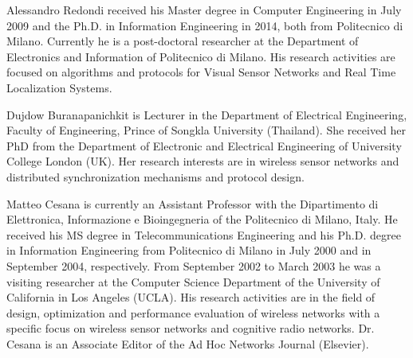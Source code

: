 \documentclass[twocolumn,english]{IEEEtran}
\theoremstyle{plain}
\theoremstyle{definition}
\begin{document}
        \newpage
        \nobalance
         \begin{biography}{Alessandro Redondi}
                received his Master degree in Computer Engineering in July 2009 and the Ph.D. in Information Engineering in 2014, both from Politecnico di Milano. Currently he is a post-doctoral researcher at the Department of Electronics and Information of Politecnico di Milano. His research activities are focused on algorithms and protocols for Visual Sensor Networks and Real Time Localization Systems.
                \end{biography}
                
\vfill
\vfill
\vfill
\vfill
\vfill
\vfill  
                                
                                \begin{biography}{Dujdow Buranapanichkit}
                                is Lecturer in the Department of Electrical Engineering, Faculty of Engineering, Prince of Songkla University (Thailand). She received her PhD from the Department of Electronic and Electrical Engineering of University College London (UK). Her research interests are in wireless sensor networks and distributed synchronization mechanisms and protocol design.
                                \end{biography}
\vfill
\vfill
\vfill
\vfill
\vfill
\vfill          

\begin{biography}{Matteo Cesana}
                is currently an Assistant Professor with the Dipartimento di Elettronica, Informazione e Bioingegneria of the Politecnico di Milano, Italy. He received his MS degree in Telecommunications Engineering and his Ph.D. degree in Information Engineering from Politecnico di Milano in July 2000 and in September 2004, respectively. From September 2002 to March 2003 he was a visiting researcher at the Computer Science Department of the University of California in Los Angeles (UCLA). His research activities are in the field of design, optimization and performance evaluation of wireless networks with a specific focus on wireless sensor networks and cognitive radio networks. Dr. Cesana is an Associate Editor of the Ad Hoc Networks Journal (Elsevier).
                \end{biography}
\end{document}
